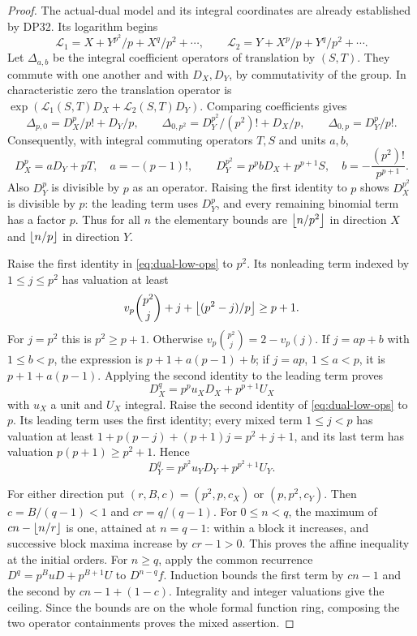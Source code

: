 \documentclass[11pt,a4paper]{article}
\theoremstyle{definition}\newtheorem{remark}[theorem]{Remark}
\begin{document}
\begin{proof}
The actual-dual model and its integral coordinates are already established by DP32. Its logarithm begins
\[
 \mathcal L_1=X+Y^{p^2}/p+X^q/p^2+\cdots,\qquad
 \mathcal L_2=Y+X^p/p+Y^q/p^2+\cdots.
\]
Let $\Delta_{a,b}$ be the integral coefficient operators of translation by $(S,T)$. They commute with one another and with $D_X,D_Y$, by commutativity of the group. In characteristic zero the translation operator is $\exp(\mathcal L_1(S,T)D_X+\mathcal L_2(S,T)D_Y)$. Comparing coefficients gives
\[
 \Delta_{p,0}=D_X^p/p!+D_Y/p,\qquad
 \Delta_{0,p^2}=D_Y^{p^2}/(p^2)!+D_X/p,\qquad
 \Delta_{0,p}=D_Y^p/p!.
\]
Consequently, with integral commuting operators $T,S$ and units $a,b$,
\begin{equation}\label{eq:dual-low-ops}
 D_X^p=aD_Y+pT,\quad a=-(p-1)!,\qquad
 D_Y^{p^2}=p^p bD_X+p^{p+1}S,\quad b=-\frac{(p^2)!}{p^{p+1}}.
\end{equation}
Also $D_Y^p$ is divisible by $p$ as an operator. Raising the first identity to $p$ shows $D_X^{p^2}$ is divisible by $p$: the leading term uses $D_Y^p$, and every remaining binomial term has a factor $p$. Thus for all $n$ the elementary bounds are $\left\lfloor n/p^2\right\rfloor$ in direction $X$ and $\left\lfloor n/p\right\rfloor$ in direction $Y$.

Raise the first identity in \eqref{eq:dual-low-ops} to $p^2$. Its nonleading term indexed by $1\le j\le p^2$ has valuation at least
\[
 v_p\binom{p^2}{j}+j+\left\lfloor (p^2-j)/p\right\rfloor\ge p+1.
\]
For $j=p^2$ this is $p^2\ge p+1$. Otherwise $v_p\binom{p^2}{j}=2-v_p(j)$. If $j=ap+b$ with $1\le b<p$, the expression is $p+1+a(p-1)+b$; if $j=ap$, $1\le a<p$, it is $p+1+a(p-1)$. Applying the second identity to the leading term proves
\[
 D_X^q=p^p u_XD_X+p^{p+1}U_X
\]
with $u_X$ a unit and $U_X$ integral. Raise the second identity of \eqref{eq:dual-low-ops} to $p$. Its leading term uses the first identity; every mixed term $1\le j<p$ has valuation at least $1+p(p-j)+(p+1)j=p^2+j+1$, and its last term has valuation $p(p+1)\ge p^2+1$. Hence
\[
 D_Y^q=p^{p^2}u_YD_Y+p^{p^2+1}U_Y.
\]

For either direction put $(r,B,c)=(p^2,p,c_X)$ or $(p,p^2,c_Y)$. Then $c=B/(q-1)<1$ and $cr=q/(q-1)$. For $0\le n<q$, the maximum of $cn-\left\lfloor n/r\right\rfloor$ is one, attained at $n=q-1$: within a block it increases, and successive block maxima increase by $cr-1>0$. This proves the affine inequality at the initial orders. For $n\ge q$, apply the common recurrence $D^q=p^BuD+p^{B+1}U$ to $D^{n-q}f$. Induction bounds the first term by $cn-1$ and the second by $cn-1+(1-c)$. Integrality and integer valuations give the ceiling. Since the bounds are on the whole formal function ring, composing the two operator containments proves the mixed assertion.


\end{proof}
\end{document}

